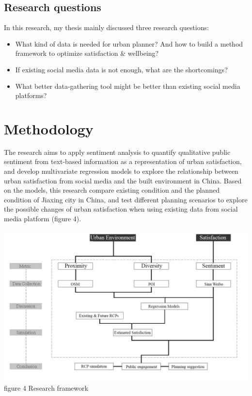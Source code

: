 \documentclass[
]{article}
\providecommand{\tightlist}{%
  \setlength{\itemsep}{0pt}\setlength{\parskip}{0pt}}
\begin{document}
\hypertarget{research-questions}{%
\subsection{Research questions}\label{research-questions}}

In this research, my thesis mainly discussed three research questions:

\begin{itemize}
\tightlist
\item
  What kind of data is needed for urban planner? And how to build a
  method framework to optimize satisfaction \& wellbeing?\\
\item
  If existing social media data is not enough, what are the
  shortcomings?\\
\item
  What better data-gathering tool might be better than existing social
  media platforms?
\end{itemize}

\hypertarget{methodology}{%
\section{Methodology}\label{methodology}}

The research aims to apply sentiment analysis to quantify qualitative
public sentiment from text-based information as a representation of
urban satisfaction, and develop multivariate regression models to
explore the relationship between urban satisfaction from social media
and the built environment in China. Based on the models, this research
compare existing condition and the planned condition of Jiaxing city in
China, and test different planning scenarios to explore the possible
changes of urban satisfaction when using existing data from social media
platform (figure 4).

\href{https://WTHSYZW.github.io/Thesis_2022/maps/workflow.png}{\includegraphics{maps/workflow.png}}
figure 4 Research framework
\end{document}
